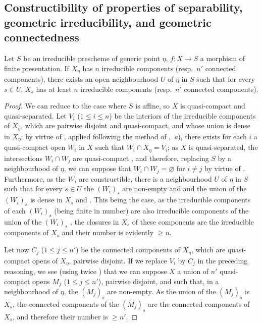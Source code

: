 \subsection{Constructibility of properties of separability, geometric irreducibility, and geometric connectedness}
\label{subsection:IV.9.7}
\label{IV.9.7}

\begin{lemma}[9.7.1]
\label{IV.9.7.1}
Let $S$ be an irreducible prescheme of generic point $\eta$, $f:X\to S$ a morphism of finite presentation.
If $X_\eta$ has $n$ irreducible components (\textup{resp.}\ $n'$ connected components), there exists an open neighbourhood $U$ of $\eta$ in $S$ such that for every $s\in U$, $X_s$ has at least $n$ irreducible components (\textup{resp.}\ $n'$ connected components).
\end{lemma}

\begin{proof}
We can reduce to the case where $S$ is affine, so $X$ is quasi-compact and quasi-separated.
Let $V_i$ ($1\leqslant i\leqslant n$) be the interiors of the irreducible components of $X_\eta$, which are pairwise disjoint and quasi-compact, and whose union is dense in $X_\eta$; by virtue of , applied following the method of ,~\emph{a}), there exists for each $i$ a quasi-compact open $W_i$ in $X$ such that $W_i\cap X_\eta=V_i$; as $X$ is quasi-separated, the intersections $W_i\cap W_j$ are quasi-compact , and therefore, replacing $S$ by a neighbourhood of $\eta$, we can suppose that $W_i\cap W_j=\varnothing$ for $i\neq j$ by virtue of .
Furthermore, as the $W_i$ are constructible, there is a neighbourhood $U$ of $\eta$ in $S$ such that for every $s\in U$ the $(W_i)_s$ are non-empty  and  and the union of the $(W_i)_s$ is dense in $X_s$  and .
This being the case, as the irreducible components of each $(W_i)_s$ (being finite in number) are also irreducible components of the union of the $(W_i)_s$ , the closures in $X_s$ of these components are the irreducible components of $X_s$  and their number is evidently $\geqslant n$.

Let now $C_j$ ($1\leqslant j\leqslant n'$) be the connected components of $X_\eta$, which are quasi-compact opens of $X_\eta$, pairwise disjoint.
If we replace $V_i$ by $C_j$ in the preceding reasoning, we see (using twice ) that we can suppose $X$ a union of $n'$ quasi-compact opens $M_j$ ($1\leqslant j\leqslant n'$), pairwise disjoint, and such that, in a neighbourhood of $\eta$, the $(M_j)_s$ are non-empty.
As the union of the $(M_j)_s$ is $X_s$, the connected components of the $(M_j)_s$ are the connected components of $X_s$, and therefore their number is $\geqslant n'$.
\end{proof}

